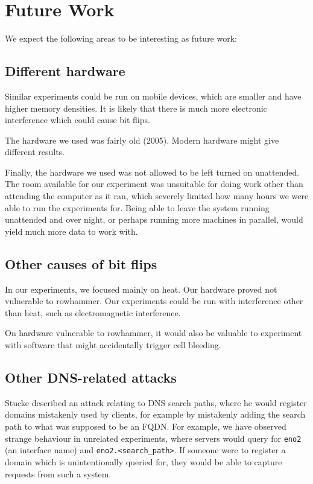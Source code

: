 \documentclass[conference]{IEEEtran}
\begin{document}
\section{Future Work}\label{sec:futwork}

We expect the following areas to be interesting as future work:

\subsection{Different hardware}

Similar experiments could be run on mobile devices, which are smaller and have
higher memory densities. It is likely that there is much more electronic
interference which could cause bit flips.

The hardware we used was fairly old (2005). Modern hardware might give
different results.

Finally, the hardware we used was not allowed to be left turned on unattended.
The room available for our experiment was unsuitable for doing work other than
attending the computer as it ran, which severely limited how many hours we were
able to run the experiments for. Being able to leave the system running
unattended and over night, or perhaps running more machines in parallel, would
yield much more data to work with.


\subsection{Other causes of bit flips}

In our experiments, we focused mainly on heat. Our hardware proved not
vulnerable to rowhammer. Our experiments could be run with interference other
than heat, such as electromagnetic interference.

On hardware vulnerable to rowhammer, it would also be valuable to experiment
with software that might accidentally trigger cell bleeding.

\subsection{Other DNS-related attacks}

Stucke\cite{suffixpath} described an attack relating to DNS search paths, where
he would register domains mistakenly used by clients, for example by mistakenly
adding the search path to what was supposed to be an FQDN. For example, we have
observed strange behaviour in unrelated experiments, where servers would query
for \texttt{eno2} (an interface name) and \texttt{eno2.<search\_path>}. If
someone were to register a domain which is unintentionally queried for, they
would be able to capture requests from such a system.


\printbibliography


\end{document}
